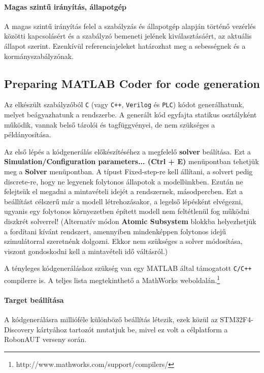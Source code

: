 \paragraph{Magas szintű irányítás, állapotgép}

A magas szintű irányítás felel a szabályzás és állapotgép alapján történő vezérlés közötti kapcsolásért és a szabályzó bemeneti jelének kiválasztásáért, az aktuális állapot szerint. Ezenkívül referenciajeleket határozhat meg a sebességnek és a kormányszabályzónak.

\subsection{Preparing MATLAB Coder for code generation}

Az elkészült szabályzóból \verb!C! (vagy \verb!C++!, \verb!Verilog! és \verb!PLC!) kódot generálhatunk, melyet beágyazhatunk a rendszerbe. A generált kód egyfajta statikus osztályként működik, vannak belső tárolói és tagfüggvényei, de nem szükséges a példányosítása.

Az első lépés a kódgenerálás előkészítéséhez a megfelelő \textbf{solver} beálítása. Ezt a \textbf{Simulation/Configuration parameters... (Ctrl + E)} menüpontban tehetjük meg a \textbf{Solver} menüpontban. A típust Fixed-step-re kell állítani, a solvert pedig discrete-re, hogy ne legyenek folytonos állapotok a modellünkben. Ezután ne felejtsük el megadni a mintavételi idejét a rendszernek, másodpercben.
Ezt a beállítást célszerű már a modell létrehozásakor, a legelső lépésként elvégezni, ugyanis egy folytonos környezetben épített modell nem feltétlenül fog működni diszkrét solverrel! (Alternatív módon \textbf{Atomic Subsystem} blokkba helyezhetjük a fordítani kívánt rendszert, amennyiben mindenképpen folytonos idejű szimulátorral szeretnénk dolgozni. Ekkor nem szükséges a solver módosítása, viszont gondoskodni kell a mintavételi idő váltásról.)

A tényleges kódgeneráláshoz szükség van egy MATLAB által támogatott \verb!C/C++! compilerre is. A teljes lista megtekinthető a MathWorks weboldalán.\footnote{http://www.mathworks.com/support/compilers/}

\paragraph{Target beállítása}

A kódgenerálásra millióféle különböző beállítás létezik, ezek közül az STM32F4-Discovery kártyához tartozót mutatjuk be, mivel ez volt a célplatform a RobonAUT verseny során.

